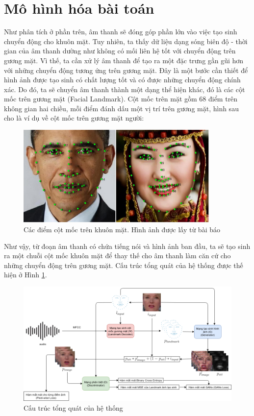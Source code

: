 \section{Mô hình hóa bài toán}\label{sec:modeling}

Như phân tích ở phần trên, âm thanh sẽ đóng góp phần lớn vào việc tạo sinh chuyển động cho khuôn mặt. Tuy nhiên, ta thấy dữ liệu dạng sóng biên độ - thời gian của âm thanh dường như không có mối liên hệ tốt với chuyển động trên gương mặt. Vì thế, ta cần xử lý âm thanh để tạo ra một đặc trưng gần gũi hơn với những chuyển động tương ứng trên gương mặt. Đây là một bước cần thiết để hình ảnh được tạo sinh có chất lượng tốt và có được những chuyển động chính xác. Do đó, ta sẽ chuyển âm thanh thành một dạng thể hiện khác, đó là các cột mốc trên gương mặt (Facial Landmark). Cột mốc trên mặt gồm 68 điểm trên không gian hai chiều, mỗi điểm đánh dấu một vị trí trên gương mặt, hình sau cho là ví dụ về cột mốc trên gương mặt người:

\begin{figure}[H]
    \centering
    \includegraphics[width=10cm]{./content/materials/landmark_intro.png}
    \caption{Các điểm cột mốc trên khuôn mặt. Hình ảnh được lấy từ bài báo \cite{landmark}}
\end{figure}

Như vậy, từ đoạn âm thanh có chứa tiếng nói và hình ảnh ban đầu, ta sẽ tạo sinh ra một chuỗi cột mốc khuôn mặt để thay thế cho âm thanh làm căn cứ cho những chuyển động trên gương mặt. Cấu trúc tổng quát của hệ thống được thế hiện ở Hình \ref{fig:common_architecture}.

\begin{figure}[H]
    \centering
    \includegraphics[width=15cm]{./content/materials/common_architecture.png}
    \caption{Cấu trúc tổng quát của hệ thống}
    \label{fig:common_architecture}
\end{figure}

